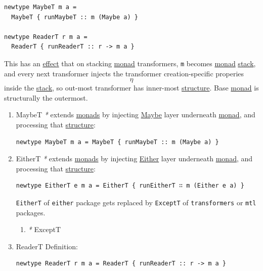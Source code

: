 \documentclass[11pt]{article}
\begin{document}
\begin{enumerate}
\begin{verbatim}
newtype MaybeT m a =
  MaybeT { runMaybeT :: m (Maybe a) }

newtype ReaderT r m a =
  ReaderT { runReaderT :: r -> m a }
\end{verbatim}

This has an \hyperref[orgc34399c]{effect} that on stacking \hyperref[org86a5d95]{monad} transformers, \texttt{m} becomes \hyperref[org86a5d95]{monad} \hyperref[org02af145]{stack}, and every next transformer injects the transformer creation-specific properies $$ \eta $$ inside the \hyperref[org02af145]{stack}, so out-most transformer has inner-most \hyperref[org8051f61]{structure}. Base \hyperref[org86a5d95]{monad} is structurally the outermost.\\

\begin{enumerate}
\item \label{org9ccf9cb}MaybeT
\label{sec:org20e0458}
\emph{*} extends \hyperref[org0d4a4ef]{monads} by injecting \hyperref[org8347bae]{Maybe} layer underneath \hyperref[org86a5d95]{monad}, and processing that \hyperref[org8051f61]{structure}:\\
\begin{verbatim}
newtype MaybeT m a = MaybeT { runMaybeT :: m (Maybe a) }
\end{verbatim}

\item \label{orgd222858}EitherT
\label{sec:orgb3b7d3b}
\emph{*} extends \hyperref[org0d4a4ef]{monads} by injecting \hyperref[org6f16842]{Either} layer underneath \hyperref[org86a5d95]{monad}, and processing that \hyperref[org8051f61]{structure}:\\

\begin{verbatim}
newtype EitherT e m a = EitherT { runEitherT ∷ m (Either e a) }
\end{verbatim}

\texttt{EitherT} of \texttt{either} package gets replaced by \texttt{ExceptT} of \texttt{transformers} or \texttt{mtl} packages.\\

\begin{enumerate}
\item \emph{*}
\label{sec:orgac7e186}
\label{org49e3e15}ExceptT\\
\end{enumerate}

\item \label{org7b37f6b}ReaderT
\label{sec:orgbbe2c6c}
Definition:\\
\begin{verbatim}
newtype ReaderT r m a = ReaderT { runReaderT :: r -> m a }
\end{verbatim}


\end{enumerate}
\end{enumerate}
\end{document}
